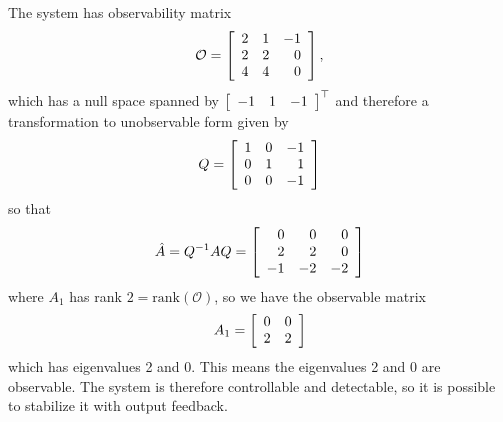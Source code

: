 \documentclass{article}
\begin{document}
\begin{enumerate}[(a)]
{%
The system has observability matrix
$$
\mathcal{O} =
\left[\begin{array}{r r r}
  2 & 1 & -1 \\
  2 & 2 &  0 \\
  4 & 4 &  0
\end{array}\right],
$$
which has a null space spanned by
$
\left[\begin{array}{r r r}
  -1 & 1 & -1
\end{array}\right]^\top
$
and therefore a transformation to unobservable form given by
$$
Q =
\left[\begin{array}{r r r}
  1 & 0 & -1 \\
  0 & 1 &  1 \\
  0 & 0 & -1
\end{array}\right]
$$
so that
$$
\hat{A} = Q^{-1} A Q =
\left[\begin{array}{r r r}
  0 &  0 &  0 \\
  2 &  2 &  0 \\
 -1 & -2 & -2
\end{array}\right]
$$
where $A_1$ has rank $2 = \mathrm{rank}(\mathcal{O})$, so
we have the observable matrix
$$
A_1 =
\left[\begin{array}{r r}
  0 &  0 \\
  2 &  2
\end{array}\right]
$$
which has eigenvalues 2 and 0.
This means the eigenvalues 2 and 0 are observable. The system is
therefore controllable and detectable, so it is possible to stabilize
it with output feedback.
}
\end{enumerate}
\end{document}

